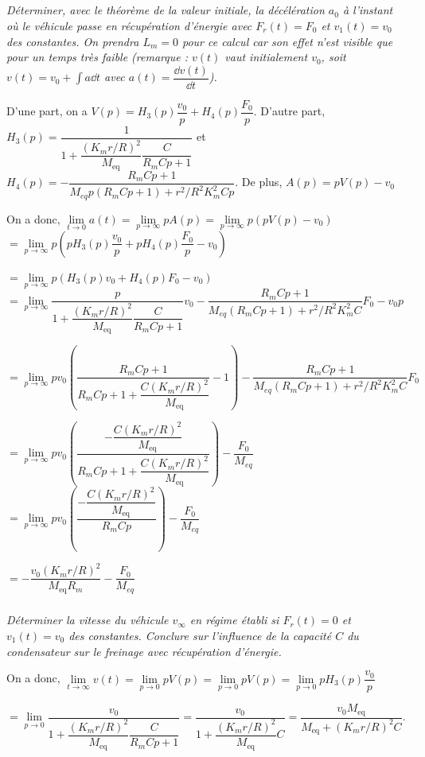 \documentclass[10pt,fleqn]{article} %
\begin{document}
\subparagraph{}
\textit{Déterminer, avec le théorème de la valeur initiale, la décélération $a_0$ à l’instant où le véhicule passe en récupération d’énergie avec $F_r (t) = F_0$ et $v_1(t) = v_0$ des constantes. On prendra $L_m = 0$ pour ce calcul car son effet n’est visible que pour un temps très faible (remarque : $v(t)$ vaut initialement $v_0$, soit $v(t) = v_0 + \int a \dd t$ avec
$a(t)=\dfrac{\dd v(t)}{\dd t}$).}
\ifprof
\begin{corrige}
D'une part, on a $V(p) = H_3(p) \dfrac{v_0}{p} + H_4(p) \dfrac{F_0}{p}$.  D'autre part, 
$H_3(p)=\dfrac{1}{1+\dfrac{\left(K_m r/R\right)^2}{M_{\text{eq}}}\dfrac{C}{R_m Cp+1}}$ et 
$H_4(p)=-\dfrac{R_mCp+1 }{M_{eq}p  \left(R_m  Cp+1\right) +r^2/R^2 K_m^2Cp}$. De plus, $A(p)=pV(p)-v_0$

On a donc, 
$\lim\limits_{t\to 0} a(t)=\lim\limits_{p\to \infty} pA(p)=\lim\limits_{p\to \infty} p\left(pV(p)-v_0\right)$
$=\lim\limits_{p\to \infty} p \left( pH_3(p) \dfrac{v_0}{p} + pH_4(p) \dfrac{F_0}{p}-v_0\right)$

$=\lim\limits_{p\to \infty} p \left( H_3(p) {v_0} + H_4(p) F_0-v_0\right)$
$=\lim\limits_{p\to \infty}   \dfrac{p}{1+\dfrac{\left(K_m r/R\right)^2}{M_{\text{eq}}}\dfrac{C}{R_m Cp+1}}  {v_0} -\dfrac{R_mCp+1 }{M_{eq}  \left(R_m  Cp+1\right) +r^2/R^2 K_m^2C} F_0 -v_0p$

$=\lim\limits_{p\to \infty}   pv_0 \left( \dfrac{R_mCp+1}{R_mCp+1+\dfrac{C\left(K_m r/R\right)^2}{M_{\text{eq}}}} -1  \right) -\dfrac{R_mCp+1 }{M_{eq}  \left(R_m  Cp+1\right) +r^2/R^2 K_m^2C} F_0$

$=\lim\limits_{p\to \infty}  pv_0 \left( \dfrac{-\dfrac{C\left(K_m r/R\right)^2}{M_{\text{eq}}}}{R_mCp+1+\dfrac{C\left(K_m r/R\right)^2}{M_{\text{eq}}}} \right)-\dfrac{ F_0}{M_{eq}} $
$=\lim\limits_{p\to \infty}  pv_0 \left( \dfrac{-\dfrac{C\left(K_m r/R\right)^2}{M_{\text{eq}}}}{R_mCp} \right)-\dfrac{ F_0}{M_{eq}} $


$=   -\dfrac{v_0\left(K_m r/R\right)^2}{M_{\text{eq}}R_m} -\dfrac{ F_0}{M_{eq}} $

\end{corrige}
\else
\fi



\subparagraph{}
\textit{Déterminer la vitesse du véhicule $v_{\infty}$ en régime établi si $F_r (t) = 0$ et $v_1(t) = v_0$ des constantes. Conclure sur l’influence de la capacité $C$ du condensateur sur le freinage avec récupération d’énergie.}
\ifprof
\begin{corrige}

On a donc, 
$\lim\limits_{t\to \infty} v(t)=\lim\limits_{p\to 0} pV(p)=\lim\limits_{p\to 0} pV(p)=\lim\limits_{p\to 0} p H_3(p) \dfrac{v_0}{p}$

$=\lim\limits_{p\to 0}   \dfrac{v_0}{1+\dfrac{\left(K_m r/R\right)^2}{M_{\text{eq}}}\dfrac{C}{R_m Cp+1}} =\dfrac{v_0}{1+\dfrac{\left(K_m r/R\right)^2}{M_{\text{eq}}}C}=\dfrac{v_0M_{\text{eq}}}{M_{\text{eq}}+\left(K_m r/R\right)^2C} $.
\end{corrige}
\else
\fi
\end{document}
